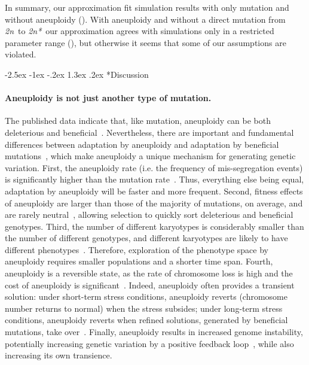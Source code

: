 \documentclass[12pt]{extarticle}
\makeatletter
\renewcommand\section{\@startsection {section}{1}{\z@}%
     {-2.5ex \@plus -1ex \@minus -.2ex}%
     {1.3ex \@plus.2ex}%
    {\Large\bfseries}}
\newcommand{\euwt}{\emph{2n}}
\newcommand{\eumt}{\emph{2n*}}
\makeatother
\begin{document}
In summary, our approximation fit simulation results with only mutation and without aneuploidy (). With aneuploidy and without a direct mutation from \euwt\ to \eumt\, our approximation agrees with simulations only in a restricted parameter range (), but otherwise it seems that some of our assumptions are violated.


\section*{Discussion}

\paragraph*{Aneuploidy is not just another type of mutation.}
The published data indicate that, like mutation, aneuploidy can be both deleterious and beneficial~\citep{Pavelka2010, Sheltzer2011}.
Nevertheless, there are important and fundamental differences between adaptation by aneuploidy
and adaptation by beneficial mutations~\citep{Yona2015}, which make aneuploidy a unique mechanism for generating genetic
variation.
First, the aneuploidy rate (i.e. the frequency of mis-segregation events) is significantly higher than the
mutation rate~\citep{Santaguida2015review}.
Thus, everything else being equal, adaptation by aneuploidy will be faster and more frequent.
Second, fitness effects of aneuploidy are larger than those of the majority of mutations, on average, and are rarely
neutral~\citep{Pavelka2010, Yona2012, Sunshine2015}, allowing selection to quickly sort deleterious and beneficial genotypes.
Third, the number of different karyotypes is considerably smaller than the number of different genotypes, and different karyotypes are likely to have different phenotypes~\citep{Pavelka2010}.
Therefore, exploration of the phenotype space by aneuploidy requires smaller populations and a shorter time span.
Fourth, aneuploidy is a reversible state, as the rate of chromosome loss is high and the cost of aneuploidy is significant~\citep{Niwa2006}.
Indeed, aneuploidy often provides a transient solution: under short-term stress conditions, aneuploidy reverts (chromosome number returns to normal) when the stress subsides; under long-term stress conditions, aneuploidy reverts when refined solutions, generated by beneficial mutations, take over~\citep{Yona2012}.
Finally, aneuploidy results in increased genome instability, potentially increasing genetic variation by a positive feedback loop~\citep{Rancati2013, Bouchonville2009, Zhu2012}, while also increasing its own transience.
\end{document}

